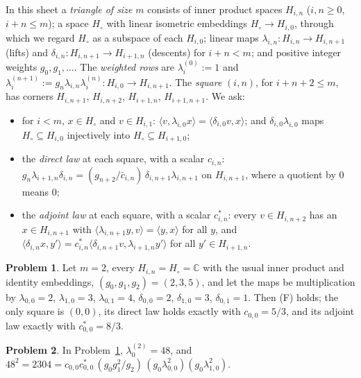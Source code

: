 \documentclass[reqno]{amsart}
\theoremstyle{definition}
\newtheorem{problem}{Problem}[section]
\theoremstyle{plain}
\newcommand{\C}{\mathbb C}
\newcommand{\Hc}{H_\circ}
\begin{document}
In this sheet a \emph{triangle of size \(m\)} consists of inner product spaces \(H_{i,n}\) (\(i, n \ge 0\), \(i + n \le m\)); a space \(\Hc\) with linear isometric embeddings \(\Hc \to H_{i,0}\), through which we regard \(\Hc\) as a subspace of each \(H_{i,0}\); linear maps \(\lambda_{i,n} \colon H_{i,n} \to H_{i,n+1}\) (lifts) and \(\delta_{i,n} \colon H_{i,n+1} \to H_{i+1,n}\) (descents) for \(i + n < m\); and positive integer weights \(g_0, g_1, \dots\).  The \emph{weighted rows} are \(\lambda_i^{(0)} := 1\) and \(\lambda_i^{(n+1)} := g_n \lambda_{i,n} \lambda_i^{(n)} \colon H_{i,0} \to H_{i,n+1}\).  The \emph{square} \((i,n)\), for \(i + n + 2 \le m\), has corners \(H_{i,n+1}\), \(H_{i,n+2}\), \(H_{i+1,n}\), \(H_{i+1,n+1}\).  We ask:
\begin{itemize}
\item[(F)] for \(i < m\), \(x \in \Hc\) and \(v \in H_{i,1}\): \(\langle v, \lambda_{i,0}x\rangle = \langle \delta_{i,0}v, x\rangle\); and \(\delta_{i,0}\lambda_{i,0}\) maps \(\Hc \subseteq H_{i,0}\) injectively into \(\Hc \subseteq H_{i+1,0}\);
\item[(D)] the \emph{direct law} at each square, with a scalar \(c_{i,n}\): \(g_n \lambda_{i+1,n}\delta_{i,n} = (g_{n+2}/\bar c_{i,n})\, \delta_{i,n+1}\lambda_{i,n+1}\) on \(H_{i,n+1}\), where a quotient by \(0\) means \(0\);
\item[(A)] the \emph{adjoint law} at each square, with a scalar \(c^*_{i,n}\): every \(v \in H_{i,n+2}\) has an \(x \in H_{i,n+1}\) with \(\langle \lambda_{i,n+1}y, v\rangle = \langle y, x\rangle\) for all \(y\), and \(\langle \delta_{i,n}x, y'\rangle = c^*_{i,n} \langle \delta_{i,n+1}v, \lambda_{i+1,n}y'\rangle\) for all \(y' \in H_{i+1,n}\).
\end{itemize}

\begin{problem}\label{pr:toy-square}
Let \(m = 2\), every \(H_{i,n} = \Hc = \C\) with the usual inner product and identity embeddings, \((g_0, g_1, g_2) = (2, 3, 5)\), and let the maps be multiplication by \(\lambda_{0,0} = 2\), \(\lambda_{1,0} = 3\), \(\lambda_{0,1} = 4\), \(\delta_{0,0} = 2\), \(\delta_{1,0} = 3\), \(\delta_{0,1} = 1\).  Then (F) holds; the only square is \((0,0)\), its direct law holds exactly with \(c_{0,0} = 5/3\), and its adjoint law exactly with \(c^*_{0,0} = 8/3\).
\end{problem}

\begin{problem}\label{pr:toy-gram}
In Problem~\ref{pr:toy-square}, \(\lambda_0^{(2)} = 48\), and
\(48^2 = 2304 = c_{0,0}c^*_{0,0}\,(g_0g_1^2/g_2)\,(g_0\lambda_{0,0}^2)(g_0\lambda_{1,0}^2)\).
\end{problem}
\end{document}
